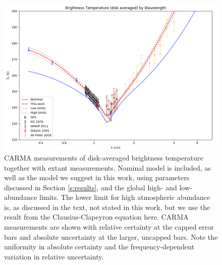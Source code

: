 \documentclass{article}
\begin{document}
	\begin{figure}
		\centering
		\includegraphics[width=\textwidth]{final_models_wl.png}
		\caption{\label{fig:emission_wl}CARMA measurements of disk-averaged brightness temperature together with extant measurements. Nominal model is included, as well as the model we suggest in this work, using parameters discussed in Section \ref{s:results}, and the global high- and low-abundance limits. The lower limit for high atmospheric abundance is, as discussed in the text, not stated in this work, but we use the result from the Clausius-Clapeyron equation here. CARMA measurements are shown with relative certainty at the capped error bars and absolute uncertainty at the larger, uncapped bars. Note the uniformity in absolute certainty and the frequency-dependent variation in relative uncertainty.}
	\end{figure}
\end{document}
